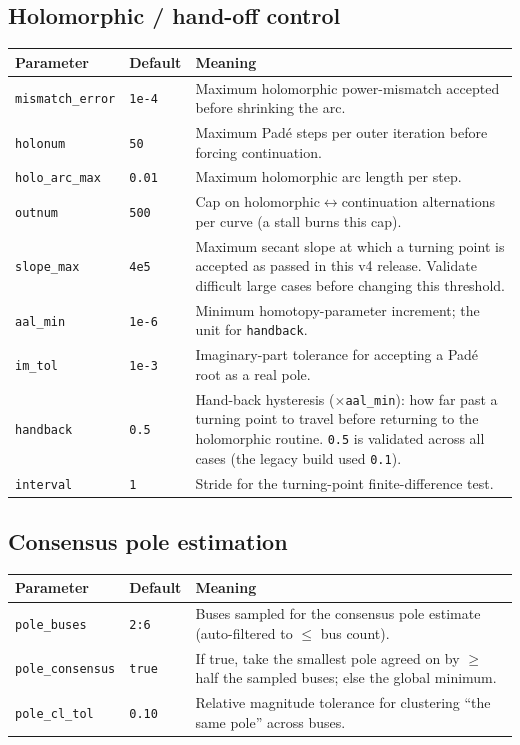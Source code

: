 \documentclass[11pt,a4paper]{article}
\newcommand{\code}[1]{\texttt{#1}}
\begin{document}
\subsection{Holomorphic / hand-off control}
\begin{center}\small
\begin{longtable}{@{}p{}p{}p{}@{}}
\toprule
\textbf{Parameter} & \textbf{Default} & \textbf{Meaning}\\
\midrule\endhead
\code{mismatch_error}& \code{1e-4} & Maximum holomorphic power-mismatch accepted before shrinking the arc.\\
\code{holonum}      & \code{50}   & Maximum Pad\'e steps per outer iteration before forcing continuation.\\
\code{holo_arc_max} & \code{0.01} & Maximum holomorphic arc length per step.\\
\code{outnum}       & \code{500}  & Cap on holomorphic$\leftrightarrow$continuation alternations per curve (a stall burns this cap).\\
\code{slope_max}    & \code{4e5}  & Maximum secant slope at which a turning point is accepted as passed in this v4 release. Validate difficult large cases before changing this threshold.\\
\code{aal_min}      & \code{1e-6} & Minimum homotopy-parameter increment; the unit for \code{handback}.\\
\code{im_tol}       & \code{1e-3} & Imaginary-part tolerance for accepting a Pad\'e root as a real pole.\\
\code{handback}     & \code{0.5}  & Hand-back hysteresis ($\times$\code{aal_min}): how far past a turning point to travel before returning to the holomorphic routine. \code{0.5} is validated across all cases (the legacy build used \code{0.1}).\\
\code{interval}     & \code{1}    & Stride for the turning-point finite-difference test.\\
\bottomrule
\end{longtable}
\end{center}

\subsection{Consensus pole estimation}
\begin{center}\small
\begin{longtable}{@{}p{}p{}p{}@{}}
\toprule
\textbf{Parameter} & \textbf{Default} & \textbf{Meaning}\\
\midrule\endhead
\code{pole_buses}     & \code{2:6}      & Buses sampled for the consensus pole estimate (auto-filtered to $\le$ bus count).\\
\code{pole_consensus}  & \code{true}     & If true, take the smallest pole agreed on by $\ge$ half the sampled buses; else the global minimum.\\
\code{pole_cl_tol}     & \code{0.10}     & Relative magnitude tolerance for clustering ``the same pole'' across buses.\\
\bottomrule
\end{longtable}
\end{center}
\end{document}
